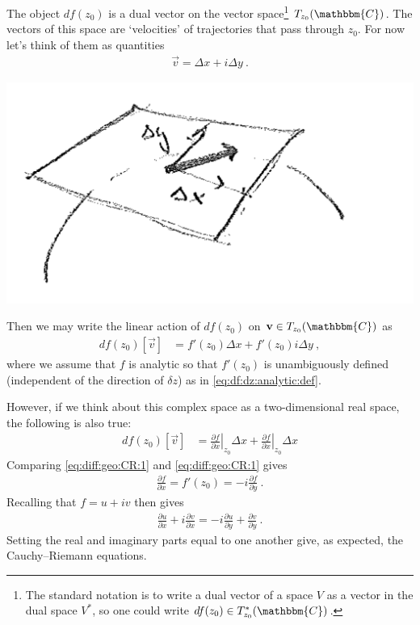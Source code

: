 The object $df(z_0)$ is a dual vector on the vector space\footnote{The standard notation is to write a dual vector of a space $V$ as a vector in the dual space $V^*$, so one could write $df(z_0) \in T^*_{z_0}(\mathbbm{C})$.} $T_{z_0}(\mathbbm{C})$.  The vectors of this space are `velocities' of trajectories that pass through $z_0$. For now let's think of them as quantities
\begin{align}
	\vec v = \Delta x + i \Delta y \ .
\end{align}
\begin{center}
\includegraphics[width=.5\textwidth]{figures/lec13_tanvec.png}
\end{center}
Then we may write the linear action of $df(z_0)$ on $\vec v \in T_{z_0}(\mathbbm{C})$ as
\begin{align}
	df(z_0)\left[\vec{v}\right] &=
	f'(z_0)\Delta x + f'(z_0)i\Delta y \ ,
	\label{eq:diff:geo:CR:1}
\end{align}
where we assume that $f$ is analytic so that $f'(z_0)$ is unambiguously defined (independent of the direction of $\delta z$) as in \eqref{eq:df:dz:analytic:def}. 

However, if we think about this complex space as a two-dimensional real space, the following is also true:
\begin{align}
	df(z_0)\left[\vec{v}\right] &=
	\left.\frac{\partial f}{\partial x}\right|_{z_0} \Delta x
	+
	\left.\frac{\partial f}{\partial x}\right|_{z_0} \Delta x
	\label{eq:diff:geo:CR:2}
\end{align}
Comparing \eqref{eq:diff:geo:CR:1} and \eqref{eq:diff:geo:CR:1} gives 
\begin{align}
	\frac{\partial f}{\partial x} = f'(z_0) = - i\frac{\partial f}{\partial y} \ .
\end{align}
Recalling that $f= u+iv$ then gives
\begin{align}
	\frac{\partial u}{\partial x}
	+ i
	\frac{\partial v}{\partial x}
	=
	-i
	\frac{\partial u}{\partial y}
	+
	\frac{\partial v}{\partial y} \ .
\end{align}
Setting the real and imaginary parts equal to one another give, as expected, the Cauchy--Riemann equations. 

